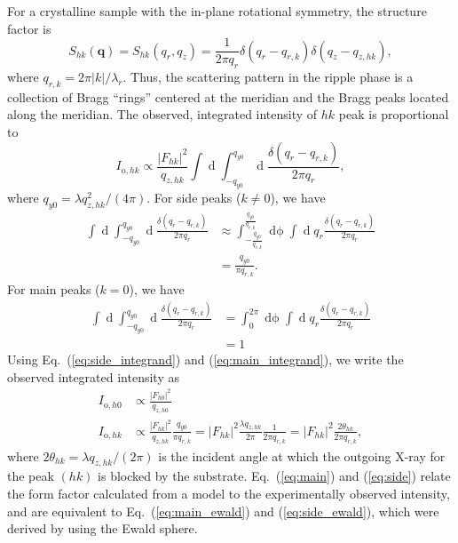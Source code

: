 For a crystalline sample with the in-plane rotational symmetry, the
structure factor is  
\begin{equation}
  S_{hk}(\mathbf{q}) = S_{hk}(q_r,q_z) 
  = \frac{1}{2\pi q_r}\delta(q_r-q_{r,k})\delta(q_z-q_{z,hk}),
\end{equation} 
where $q_{r,k}=2\pi |k|/\lambda_r$. Thus, the scattering pattern in the 
ripple phase is a 
collection of Bragg ``rings'' centered at the meridian and the 
Bragg peaks located along the meridian.  
The observed, integrated intensity of $hk$ peak is proportional to
\begin{equation}
  I_{\mathrm{o},hk} 
    \propto \frac{\lvert F_{hk} \rvert^2}{q_{z,hk}} \int\mathop{dq_x} 
            \int_{-q_{y0}}^{q_{y0}}
            \mathop{dq_y} \frac{\delta(q_r-q_{r,k})}{2\pi q_r},
\end{equation}
where $q_{y0} = \lambda q_{z,hk}^2/(4\pi)$.
For side peaks ($k \neq 0$), we have 
\begin{align}
  \int\mathop{dq_x} \int_{-q_{y0}}^{q_{y0}}\mathop{dq_y} \frac{\delta(q_r-q_{r,k})}{2\pi q_r}
  &\approx \int_{-\frac{q_{y0}}{q_{r,k}}}^{\frac{q_{y0}}{q_{r,k}}} \mathop{d\phi} 
          \int \mathop{dq_r} q_r\frac{\delta(q_r-q_{r,k})}{2\pi q_r} \nonumber\\
 &= \frac{q_{y0}}{\pi q_{r,k}}. \label{eq:side_integrand}
\end{align}
For main peaks ($k=0$), we have 
\begin{align}
  \int\mathop{dq_x} \int_{-q_{y0}}^{q_{y0}}\mathop{dq_y} \frac{\delta(q_r-q_{r,k})}{2\pi q_r}
  &= \int_0^{2\pi}\mathop{d\phi} \int\mathop{dq_r} q_r\frac{\delta(q_r-q_{r,k})}{2\pi q_r} \nonumber\\
  &= 1 \label{eq:main_integrand}
\end{align}
Using Eq.~(\ref{eq:side_integrand}) and (\ref{eq:main_integrand}), 
we write the observed integrated intensity as
\begin{align}
  I_{\mathrm{o},h0} &\propto \frac{|F_{h0}|^2}{q_{z,h0}} \label{eq:main}\\
  I_{\mathrm{o},hk} &\propto \frac{|F_{hk}|^2}{q_{z,hk}} \frac{q_{y0}}{\pi q_{r,k}}
    = |F_{hk}|^2 \frac{\lambda q_{z,hk}}{2\pi}\frac{1}{2\pi q_{r,k}}
    = |F_{hk}|^2 \frac{2\theta_{hk}}{2\pi q_{r,k}}, \label{eq:side}
\end{align}
where $2\theta_{hk} = \lambda q_{z,hk}/(2\pi)$ is the incident angle at which 
the outgoing X-ray for the peak $(hk)$ is blocked by the substrate.
Eq.~(\ref{eq:main}) and (\ref{eq:side}) relate the form factor calculated from
a model to the experimentally observed intensity, and are 
equivalent to Eq.~(\ref{eq:main_ewald}) and (\ref{eq:side_ewald}), 
which were derived by using the Ewald sphere. 

